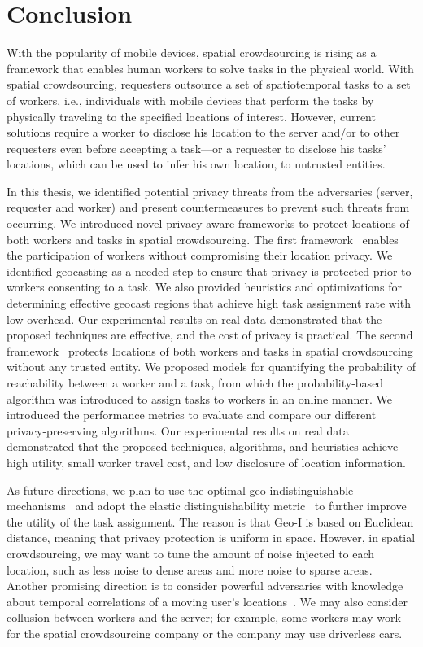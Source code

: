 \documentclass{USC-Thesis}
\numberwithin{equation}{chapter}
\begin{document}
\chapter{Conclusion}

With the popularity of mobile devices, spatial crowdsourcing is rising as a framework that enables
human workers to solve tasks in the physical world. With spatial crowdsourcing, requesters outsource a set of spatiotemporal tasks to a set of workers, i.e., individuals with mobile devices that perform the tasks by physically traveling to the specified locations of interest. However, current solutions require a worker to disclose his location to the server and/or to other requesters even before accepting a task---or a requester to disclose his tasks' locations, which can be used to infer his own location, to untrusted entities.

In this thesis, we identified potential privacy threats from the adversaries (server, requester and worker) and present countermeasures to prevent such threats from occurring. We introduced novel privacy-aware frameworks to protect locations of both workers and tasks in spatial crowdsourcing. 
The first framework~\cite{to2014framework} enables the participation of workers without compromising their location privacy.
We identified geocasting as a needed step to ensure that privacy is protected prior to workers consenting to a task. We also provided heuristics and optimizations for determining effective geocast regions that achieve high task assignment rate with low overhead. Our experimental results on real data demonstrated that the proposed techniques are effective, and the cost of privacy is practical.
The second framework~\cite{to2018privacy} protects locations of both workers and tasks in spatial crowdsourcing without any trusted entity. We proposed models for quantifying the probability of reachability between a worker and a task, from which the probability-based algorithm was introduced to assign tasks to workers in an online manner. We introduced the performance metrics to evaluate and compare our different privacy-preserving algorithms. Our experimental results on real data demonstrated that the proposed techniques, algorithms, and heuristics achieve high utility, small worker travel cost, and low disclosure of location information.

As future directions, we plan to use the optimal geo-indistinguishable mechanisms~\cite{bordenabe2014optimal} and adopt the elastic distinguishability metric~\cite{chatzikokolakis2015constructing} to further improve the utility of the task assignment. The reason is that Geo-I is based on Euclidean distance, meaning that privacy protection is uniform in space. However, in spatial crowdsourcing, we may want to tune the amount of noise injected to each location, such as less noise to dense areas and more noise to sparse areas. Another promising direction is to consider powerful adversaries with knowledge about temporal correlations of a moving user's locations~\cite{xiao2015protecting}. We may also consider collusion between workers and the server; for example, some workers may work for the spatial crowdsourcing company or the company may use driverless cars.




%
%



\balance

%
\end{document}
